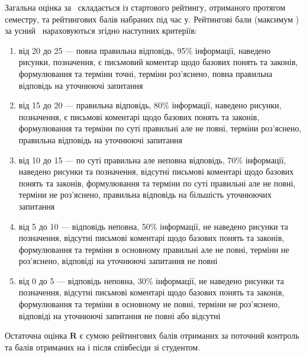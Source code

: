 \documentclass{Syllabus}
\begin{document}
Загальна оцінка за \control\ складається із стартового рейтингу, отриманого протягом семестру, та рейтингових балів набраних під час \control у. Рейтингові бали (максимум \kontrolBalu) за усний \control\ нараховуються згідно наступних критеріїв:
\begin{enumerate}[label=$\bullet$]
	\item від 20 до 25 --- повна правильна відповідь, 95\% інформації, наведено рисунки, позначення, є письмовий коментар щодо базових понять та законів, формулювання та терміни точні, терміни роз’яснено, повна правильна відповідь на уточнюючі запитання
	\item від 15 до 20 --- правильна відповідь, 80\% інформації, наведено рисунки, позначення, є письмові коментарі щодо базових понять та законів, формулювання та терміни по суті правильні але не повні, терміни роз’яснено, правильна відповідь на уточнюючі запитання
	\item від 10 до 15 --- по суті правильна але неповна відповідь, 70\% інформації, наведено рисунки та позначення, відсутні письмові коментарі щодо базових понять та законів, формулювання та терміни по суті правильні але не повні, терміни не роз’яснено, правильна відповідь на більшість уточнюючих запитання
	\item від 5 до 10 --- відповідь неповна, 50\% інформації, не наведено рисунки та позначення, відсутні письмові коментарі щодо базових понять та законів, формулювання та терміни в основному правильні але не повні, терміни не роз’яснено, відповіді на уточнюючі запитання не повні
	\item від 0 до 5 --- відповідь неповна, 30\% інформації, не наведено рисунки та позначення, відсутні письмові коментарі щодо базових понять та законів, формулювання та терміни в основному не повні, терміни не роз’яснено, відповіді на уточнюючі запитання не повні або відсутні
\end{enumerate}


Остаточна оцінка $\mathbf{R}$ є сумою рейтингових балів отриманих за поточний контроль та балів отриманих на \control і після співбесіди зі студентом.
\end{document}
